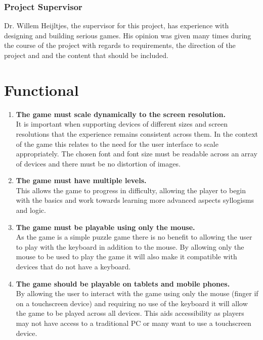 \documentclass[12pt,a4paper]{report}
\begin{document}
\subsubsection{Project Supervisor}
Dr. Willem Heijltjes, the supervisor for this project, has experience with designing and building serious games. His opinion was given many times during the course of the project with regards to requirements, the direction of the project and and the content that should be included.

 \section{Functional}
   \begin{enumerate}[label*=\arabic*]
   
   
   
   
            \item \textbf{The game must scale dynamically to the screen resolution.}\\
It is important when supporting devices of different sizes and screen resolutions that the experience remains consistent across them. In the context of the game this relates to the need for the user interface to scale appropriately. The chosen font and font size must be readable across an array of devices and there must be no distortion of images.

            \item \textbf{The game must have multiple levels.}\\
This allows the game to progress in difficulty, allowing the player to begin with the basics and work towards learning more advanced aspects syllogisms and logic.

            \item \textbf{The game must be playable using only the mouse.}\\
As the game is a simple puzzle game there is no benefit to allowing the user to play with the keyboard in addition to the mouse. By allowing only the mouse to be used to play the game it will also make it compatible with devices that do not have a keyboard.

 \item \textbf{The game should be playable on tablets and mobile phones.}\\
By allowing the user to interact with the game using only the mouse (finger if on a touchscreen device) and requiring no use of the keyboard it will allow the game to be played across all devices. This aids accessibility as players may not have access to a traditional PC or many want to use a touchscreen device.	



\end{enumerate}
\end{document}
